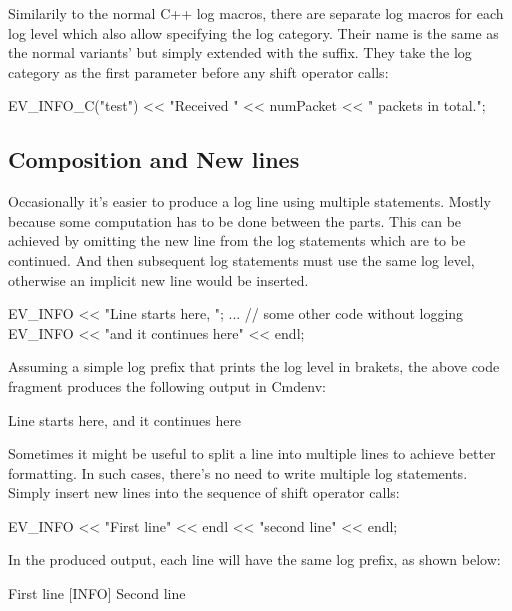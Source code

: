 Similarily to the normal C++ log macros, there are separate log macros for each
log level which also allow specifying the log category. Their name is the same
as the normal variants' but simply extended with the  suffix. They
take the log category as the first parameter before any shift operator calls:

\begin{cpp}
EV_INFO_C("test") << "Received " << numPacket << " packets in total.\n";
\end{cpp}

\subsection{Composition and New lines}
\label{sec:sim-lib:logging-composition-and-new-lines}

Occasionally it's easier to produce a log line using multiple statements.
Mostly because some computation has to be done between the parts. This can be
achieved by omitting the new line from the log statements which are to be
continued. And then subsequent log statements must use the same log level,
otherwise an implicit new line would be inserted.

\begin{cpp}
EV_INFO << "Line starts here, ";
... // some other code without logging
EV_INFO << "and it continues here" << endl;
\end{cpp}

Assuming a simple log prefix that prints the log level in brakets, the above
code fragment produces the following output in Cmdenv:

\begin{filelisting}
[INFO] Line starts here, and it continues here
\end{filelisting}

Sometimes it might be useful to split a line into multiple lines to achieve
better formatting. In such cases, there's no need to write multiple log
statements. Simply insert new lines into the sequence of shift operator calls:

\begin{cpp}
EV_INFO << "First line" << endl << "second line" << endl;
\end{cpp}

In the produced output, each line will have the same log prefix, as shown below:

\begin{filelisting}
[INFO] First line
[INFO] Second line
\end{filelisting}

